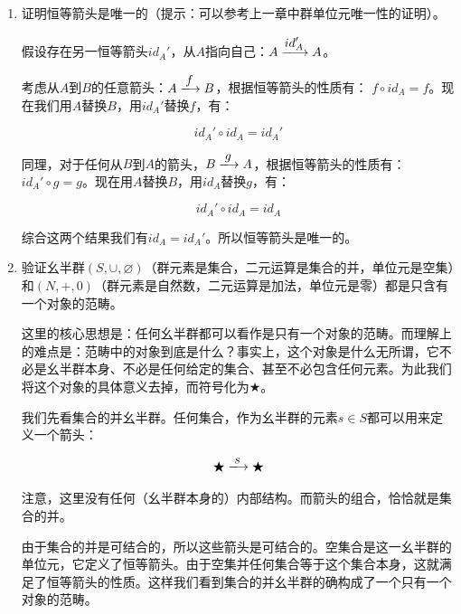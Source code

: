\documentclass[UTF8]{article}
\begin{document}
\begin{enumerate}
\item {证明恒等箭头是唯一的（提示：可以参考上一章中群单位元唯一性的证明）。}

假设存在另一恒等箭头$id_A'$，从$A$指向自己：$A \arrowto{id_A'} A$。

考虑从$A$到$B$的任意箭头：$A \arrowto{f} B$，根据恒等箭头的性质有：
$f \circ id_A = f$。现在我们用$A$替换$B$，用$id_A'$替换$f$，有：

\[
id_A' \circ id_A = id_A'
\]

同理，对于任何从$B$到$A$的箭头，$B \arrowto{g} A$，根据恒等箭头的性质有：
$id_A' \circ g = g$。现在用$A$替换$B$，用$id_A$替换$g$，有：

\[
id_A' \circ id_A = id_A
\]

综合这两个结果我们有$id_A = id_A'$。所以恒等箭头是唯一的。

\item {验证幺半群$(S, \cup, \varnothing)$（群元素是集合，二元运算是集合的并，单位元是空集）和$(N, +, 0)$（群元素是自然数，二元运算是加法，单位元是零）都是只含有一个对象的范畴。}

这里的核心思想是：任何幺半群都可以看作是只有一个对象的范畴。而理解上的难点是：范畴中的对象到底是什么？事实上，这个对象是什么无所谓，它不必是幺半群本身、不必是任何给定的集合、甚至不必包含任何元素。为此我们将这个对象的具体意义去掉，而符号化为$\bigstar$。

我们先看集合的并幺半群。任何集合，作为幺半群的元素$s \in S$都可以用来定义一个箭头：

\[
\bigstar \arrowto{s} \bigstar
\]

注意，这里没有任何（幺半群本身的）内部结构。而箭头的组合，恰恰就是集合的并。

\begin{center}
\end{center}

由于集合的并是可结合的，所以这些箭头是可结合的。空集合是这一幺半群的单位元，它定义了恒等箭头。由于空集并任何集合等于这个集合本身，这就满足了恒等箭头的性质。这样我们看到集合的并幺半群的确构成了一个只有一个对象的范畴。


\end{enumerate}
\end{document}
